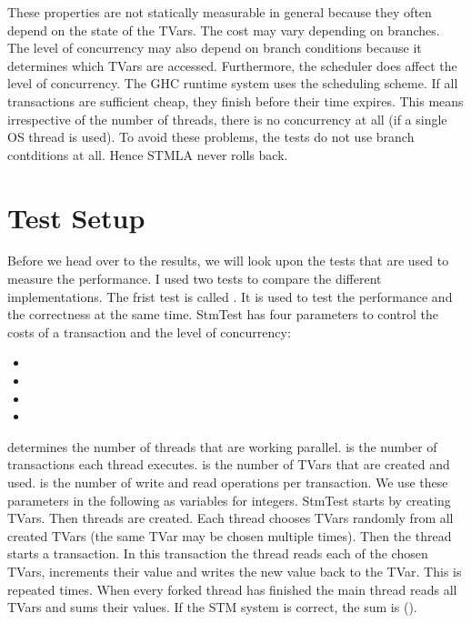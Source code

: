 These properties are not statically measurable in general because they often depend on the state of the TVars. 
The cost may vary depending on branches. The level of concurrency may also 
depend on branch conditions because it determines which TVars are accessed. Furthermore,
the scheduler does affect the level of concurrency. The GHC runtime system uses the 
scheduling scheme. If all transactions are sufficient cheap, they finish before their time expires.
This means irrespective of the number of threads, there is no concurrency at all (if a single OS thread
is used). To avoid these problems, the tests do not use branch contditions at all. Hence STMLA never rolls back.

\section{Test Setup}
Before we head over to the results, we will look upon the tests that are used to measure the performance.
I used two tests to compare the different implementations. The frist test is called .
It is used to test the performance and the correctness at the same time. StmTest has four parameters to control
the costs of a transaction and the level of concurrency:
\begin{itemize}
 \item {}
 \item {}
 \item {}
 \item {}
\end{itemize}
 determines the number of threads that are working parallel.  is the number of transactions
each thread executes.  is the number of TVars that are created and used.  is the number of write
and read operations per transaction. We use these parameters in the following as variables for integers.
StmTest starts by creating  TVars. Then  threads are created. Each thread chooses  TVars randomly from all 
created TVars (the same TVar may be chosen multiple times). Then the thread starts a transaction. In this transaction the thread reads each of the chosen 
TVars, increments their value and writes the new value back to the TVar. This is repeated  times. When every forked thread has finished the
main thread reads all TVars and sums their values. If the STM system is correct, the sum is ().

